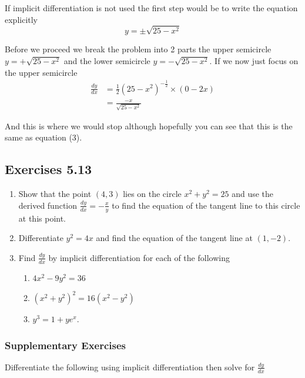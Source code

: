 If implicit differentiation is not used the first step would be to write the equation explicitly
\begin{equation*}y = \pm \sqrt{25 -x^{2}}
\end{equation*}

Before we proceed we break the problem into 2 parts the upper semicircle $y = +\sqrt{25 -x^{2}}$ and the lower semicircle $y = -\sqrt{25 -x^{2}}$. If we now just focus on the upper semicircle
\begin{align*}\frac{d y}{d x} &  = \frac{1}{2} (25 -x^{2})^{ -\frac{1}{2}} \times (0 -2 x) \\
 &  = \frac{ -x}{\sqrt{25 -x^{2}}}\end{align*}

And this is where we would stop although hopefully you can see that this is the same as equation
(3). 

\subsection{Exercises 5.13}
\begin{enumerate}
\item Show that the point $\left (4 ,3\right )$ lies on the circle $x^{2} +y^{2} =25$ and use the derived function $\frac{d y}{d x} = -\frac{x}{y}$ to find the equation of the tangent line to this circle at this point. 

\item Differentiate
$y^{2} =4 x$ and find the equation of the tangent line at $\left (1 , -2\right )\text{.}$ 

\item Find $\frac{d y}{d x}$ by implicit differentiation for each of the following 


\begin{enumerate}
\item $4 x^{2} -9 y^{2} =36$ 

\item $\left (x^{2} +y^{2}\right )^{2} =16 \left (x^{2} -y^{2}\right )$ 

\item $y^{3} =1 +y e^{x}$. \end{enumerate}
\end{enumerate}


\subsubsection{Supplementary Exercises}
Differentiate the following using implicit differentiation then solve for $\frac{d y}{d x}$ 


